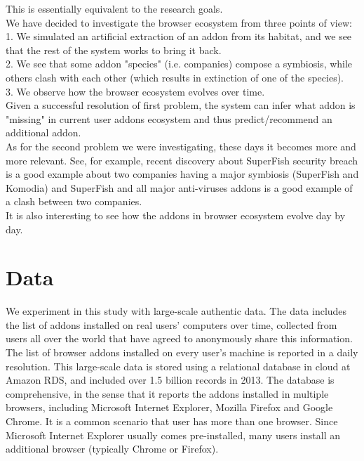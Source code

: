 \documentclass[11pt,oneside]{book}
\let\Oldsection\section
\renewcommand{\section}{\FloatBarrier\Oldsection}
\begin{document}
This is essentially equivalent to the research goals.\\
We have decided to investigate the browser ecosystem from three points of view:\\
1. We simulated an artificial extraction of an addon from its habitat, and we see that the rest of the system works to bring it back.\\
2. We see that some addon "species" (i.e. companies) compose a symbiosis, while others clash with each other (which results in extinction of one of the species).\\
3. We observe how the browser ecosystem evolves over time.\\
Given a successful resolution of first problem, the system can infer what addon is "missing" in current user addons ecosystem and thus predict/recommend an additional addon.\\
As for the second problem we were investigating, these days it becomes more and more relevant. See, for example, recent discovery about SuperFish security breach is a good example about two companies having a major symbiosis (SuperFish and Komodia) and SuperFish and all major anti-viruses addons is a good example of a clash between two companies.\\
It is also interesting to see how the addons in browser ecosystem evolve day by day.



\chapter{Data}
\label{sec:datasets}

We experiment in this study with large-scale authentic data.  The data includes the list of addons installed on real users' computers over time, collected from users all over the world that have agreed to anonymously share this information.  The list of browser addons installed on every user's machine is reported in a daily resolution.  This large-scale data is stored using a relational database in cloud at Amazon RDS, and included over 1.5 billion records in 2013. The database is comprehensive, in the sense that it  reports the addons installed in multiple browsers, including Microsoft Internet  Explorer, Mozilla Firefox and Google Chrome. It  is a common scenario that user has more than one browser. Since Microsoft Internet Explorer usually comes pre-installed, many users install an additional browser (typically Chrome or Firefox).
\end{document}
